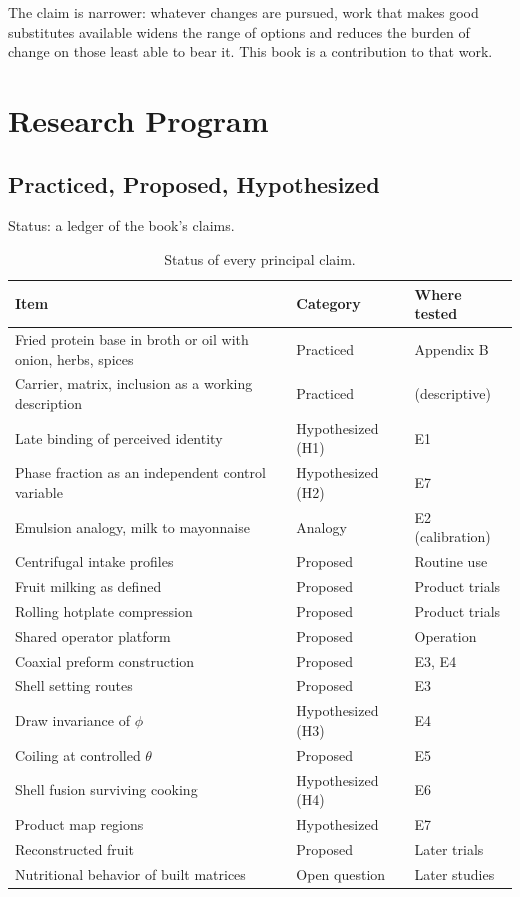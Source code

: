 \documentclass[11pt,openany]{book}
\theoremstyle{definition}
\begin{document}
The claim is narrower: whatever changes are pursued, work that makes good substitutes available widens the range of options and reduces the burden of change on those least able to bear it. This book is a contribution to that work.

\part{Research Program}

\chapter{Practiced, Proposed, Hypothesized}\label{ch:ledger}

Status: a ledger of the book's claims.

\begin{table}[h]
\centering
\small
\begin{tabularx}{\linewidth}{@{}Xll@{}}
\toprule
Item & Category & Where tested \\
\midrule
Fried protein base in broth or oil with onion, herbs, spices & Practiced & Appendix B \\
Carrier, matrix, inclusion as a working description & Practiced & (descriptive) \\
Late binding of perceived identity & Hypothesized (H1) & E1 \\
Phase fraction as an independent control variable & Hypothesized (H2) & E7 \\
Emulsion analogy, milk to mayonnaise & Analogy & E2 (calibration) \\
Centrifugal intake profiles & Proposed & Routine use \\
Fruit milking as defined & Proposed & Product trials \\
Rolling hotplate compression & Proposed & Product trials \\
Shared operator platform & Proposed & Operation \\
Coaxial preform construction & Proposed & E3, E4 \\
Shell setting routes & Proposed & E3 \\
Draw invariance of $\phi$ & Hypothesized (H3) & E4 \\
Coiling at controlled $\theta$ & Proposed & E5 \\
Shell fusion surviving cooking & Hypothesized (H4) & E6 \\
Product map regions & Hypothesized & E7 \\
Reconstructed fruit & Proposed & Later trials \\
Nutritional behavior of built matrices & Open question & Later studies \\
\bottomrule
\end{tabularx}
\caption{Status of every principal claim.}
\end{table}
\end{document}
